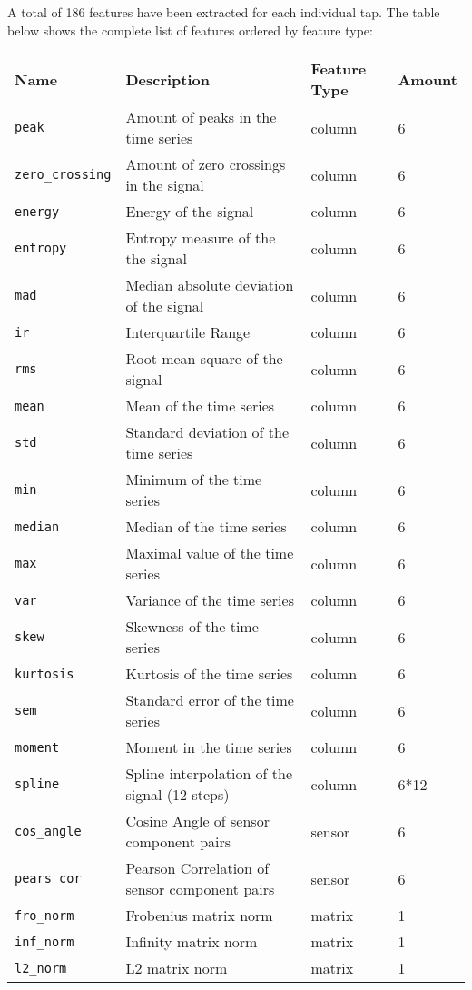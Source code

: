 A total of 186 features have been extracted for each individual tap. The table below shows the complete list of features ordered by feature type:
\begin{center}
  \begin{tabular}{ | l| l | l | l |}
  \hline
  Name & Description & Feature Type & Amount \\
  \hline
    \texttt{peak} & Amount of peaks in the time series & column  & 6 \\
    \texttt{zero\_crossing} & Amount of zero crossings in the signal & column  & 6 \\ 
    \texttt{energy} & Energy of the signal & column  & 6 \\ 
    \texttt{entropy} & Entropy measure of the the signal & column  & 6 \\
    \texttt{mad} & Median absolute deviation of the signal & column  & 6 \\
    \texttt{ir} & Interquartile Range & column  & 6 \\
    \texttt{rms} & Root mean square of the signal & column  & 6 \\
    \texttt{mean} & Mean of the time series & column  & 6 \\
    \texttt{std} & Standard deviation of the time series & column  & 6 \\
    \texttt{min} & Minimum of the time series & column  & 6 \\
    \texttt{median} & Median of the time series & column  & 6 \\
    \texttt{max} & Maximal value of the time series & column  & 6 \\
    \texttt{var} & Variance of the time series & column  & 6 \\
    \texttt{skew} & Skewness of the time series & column  & 6 \\
    \texttt{kurtosis} & Kurtosis of the time series & column  & 6 \\
    \texttt{sem} & Standard error of the time series & column  & 6 \\
    \texttt{moment} & Moment in the time series & column & 6 \\
    \texttt{spline} & Spline interpolation of the signal (12 steps) & column  & 6*12 \\
  \hline
    \texttt{cos\_angle} & Cosine Angle of sensor component pairs & sensor & 6 \\
    \texttt{pears\_cor} & Pearson Correlation of sensor component pairs & sensor & 6 \\
  \hline
    \texttt{fro\_norm} & Frobenius matrix norm & matrix & 1 \\
    \texttt{inf\_norm} & Infinity matrix norm & matrix & 1 \\
    \texttt{l2\_norm} & L2 matrix norm & matrix & 1 \\
  \hline
  \end{tabular}
\end{center}

